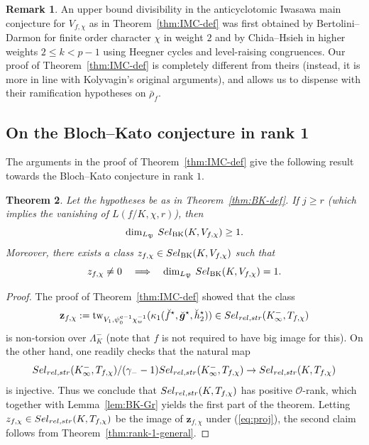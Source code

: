 \documentclass[10pt,letterpaper]{amsart}
\theoremstyle{plain}
\newtheorem{thm}{Theorem}[subsection] %
\theoremstyle{definition}
\newtheorem{rmk}[thm]{Remark}
\theoremstyle{definition}
\theoremstyle{plain}
\theoremstyle{plain}
\theoremstyle{plain}
\theoremstyle{remark}
\numberwithin{equation}{section}
\newcommand{\cc}{\mathbf{c}}
\newcommand{\Sel}{Sel}
\newcommand{\relstr}{{{\rm rel},{\rm str}}}
\def\cO{\mathcal O}
\def\Sel{{\rm Sel}}
\newcommand{\bfg}{{\boldsymbol{g}}}
\begin{document}
\begin{rmk} An upper bound divisibility in the anticyclotomic Iwasawa main conjecture for $V_{f,\chi}$ as in Theorem~\ref{thm:IMC-def} 
was first obtained by Bertolini--Darmon \cite{bdIMC} for finite order character $\chi$ in weight $2$ and by Chida--Hsieh \cite{ChHs2} in higher weights $2\leq k<p-1$ using Heegner cycles and 
level-raising congruences. Our proof of Theorem~\ref{thm:IMC-def} is completely different from theirs (instead, it is more in line with Kolyvagin's original arguments), and allows us to dispense with their ramification hypotheses on $\bar{\rho}_f$. 
\end{rmk}

\subsection{On the Bloch--Kato conjecture in rank 1} 

The arguments in the proof of Theorem~\ref{thm:IMC-def} give the following result towards the Bloch--Kato conjecture in rank $1$.

\begin{thm}\label{thm:BK-def-1}
Let the hypotheses be as in Theorem~\ref{thm:BK-def}. 
If $j\geq r$ (which implies the vanishing of $L(f/K,\chi,r)$), then 
\[
\dim_{L_\mathfrak{P}}\,\Sel_{\mathrm{BK}}(K,V_{f,\chi})\geq 1.
\]
Moreover, there exists a class $z_{f,\chi}\in\Sel_{\mathrm{BK}}(K,V_{f,\chi})$ such that
\[
z_{f,\chi}\neq 0\quad\Longrightarrow\quad\dim_{L_\mathfrak{P}}\,\Sel_{\mathrm{BK}}(K,V_{f,\chi})=1.
\]
\end{thm}

\begin{proof}
The proof of Theorem~\ref{thm:IMC-def} showed that the class
\[
\mathbf{z}_{f,\chi}:={\mathrm{tw}}_{V_1,\psi_0^{\cc-1}\chi_w^{-1}}(\kappa_1(\breve{f}^\star,\breve{\bfg}^\star,\breve{h}_2^\star))\in\Sel_{\relstr}(K_\infty^-,T_{f,\chi})
\]
is non-torsion over $\Lambda_K^-$ (note that $f$ is not required to have big image for this). On the other hand, one readily checks that the natural map
\begin{equation}\label{eq:proj}
\Sel_{\relstr}(K_\infty^-,T_{f,\chi})/(\gamma_--1)\Sel_{\relstr}(K_\infty^-,T_{f,\chi})\rightarrow\Sel_{\relstr}(K,T_{f,\chi})
\end{equation}
is injective. Thus we conclude that $\Sel_{\relstr}(K,T_{f,\chi})$ has positive $\cO$-rank, which together with  Lemma~\ref{lem:BK-Gr} yields the first part of the theorem. Letting $z_{f,\chi}\in\Sel_{\relstr}(K,T_{f,\chi})$ be the image of $\mathbf{z}_{f,\chi}$ under (\ref{eq:proj}), 
the second claim follows from Theorem~\ref{thm:rank-1-general}.
\end{proof}
\end{document}
